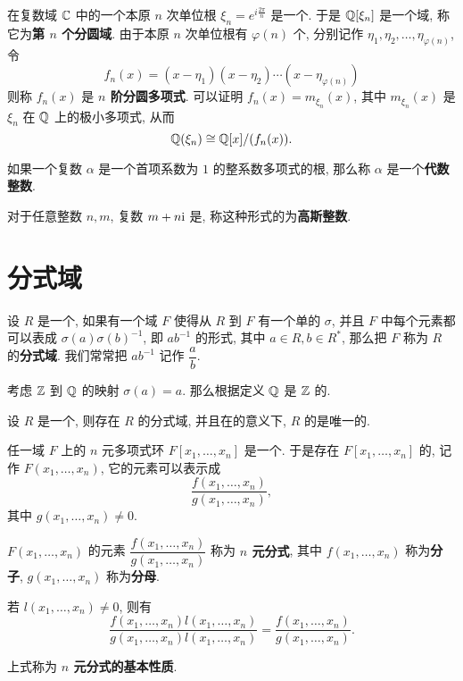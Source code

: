 \begin{definition}\label{分圆域}\label{分圆多项式}
	在复数域 $\mathbb C$ 中的一个本原 $n$ 次单位根 $\xi_n=e^{i\frac{2\pi}{n}}$ 是一个. 于是 $\mathbb Q[\xi_n]$ 是一个域, 称它为\textbf{第 $n$ 个分圆域}. 由于本原 $n$ 次单位根有 $\varphi(n)$ 个, 分别记作 $\eta_1,\eta_2,\ldots,\eta_{\varphi(n)}$, 令 $$f_n(x)=(x-\eta_1)(x-\eta_2)\cdots(x-\eta_{\varphi(n)})$$ 则称 $f_n(x)$ 是 \textbf{$n$ 阶分圆多项式}. 可以证明 $f_n(x)=m_{\xi_n}(x)$, 其中 $m_{\xi_n}(x)$ 是 $\xi_n$ 在 $\mathbb Q$ 上的极小多项式, 从而 $$\mathbb Q(\xi_n)\cong \mathbb Q[x]/(f_n(x)).$$
\end{definition}

\begin{definition}\label{代数整数}
	如果一个复数 $\alpha$ 是一个首项系数为 $1$ 的整系数多项式的根, 那么称 $\alpha$ 是一个\textbf{代数整数}.
\end{definition}

\begin{definition}\label{高斯整数}
	对于任意整数 $n,m$, 复数 $m+n\text {i}$ 是, 称这种形式的为\textbf{高斯整数}.
\end{definition}

\section{分式域}

\begin{definition}\label{分式域}
	设 $R$ 是一个, 如果有一个域 $F$ 使得从 $R$ 到 $F$ 有一个单的 $\sigma$, 并且 $F$ 中每个元素都可以表成 $\sigma(a)\sigma(b)^{-1}$, 即 $ab^{-1}$ 的形式, 其中 $a\in R,b\in R^*$, 那么把 $F$ 称为 $R$ 的\textbf{分式域}. 我们常常把 $ab^{-1}$ 记作 $\dfrac{a}{b}$.
\end{definition}

\begin{example}
	考虑 $\mathbb Z$ 到 $\mathbb Q$ 的映射 $\sigma(a)=a$. 那么根据定义 $\mathbb Q$ 是 $\mathbb Z$ 的.
\end{example}

\begin{theorem}
	设 $R$ 是一个, 则存在 $R$ 的分式域, 并且在的意义下, $R$ 的是唯一的.
\end{theorem}

任一域 $F$ 上的 $n$ 元多项式环 $F[x_1,\ldots,x_n]$ 是一个. 于是存在 $F[x_1,\ldots,x_n]$ 的, 记作 $F(x_1,\ldots,x_n)$, 它的元素可以表示成 $$\frac{f(x_1,\ldots,x_n)}{g(x_1,\ldots,x_n)},$$ 其中 $g(x_1,\ldots,x_n)\neq 0$.

\begin{definition}
	$F(x_1,\ldots,x_n)$ 的元素 $\dfrac{f(x_1,\ldots,x_n)}{g(x_1,\ldots,x_n)}$ 称为 \textbf{$n$ 元分式}, 其中 $f(x_1,\ldots,x_n)$ 称为\textbf{分子}, $g(x_1,\ldots,x_n)$ 称为\textbf{分母}.

	若 $l(x_1,\ldots,x_n)\neq 0$, 则有
	\begin{equation}
		\frac{f(x_1,\ldots,x_n)l(x_1,\ldots,x_n)}{g(x_1,\ldots,x_n)l(x_1,\ldots,x_n)}=\frac{f(x_1,\ldots,x_n)}{g(x_1,\ldots,x_n)}.
	\end{equation}

	上式称为 \textbf{$n$ 元分式的基本性质}.
\end{definition}
